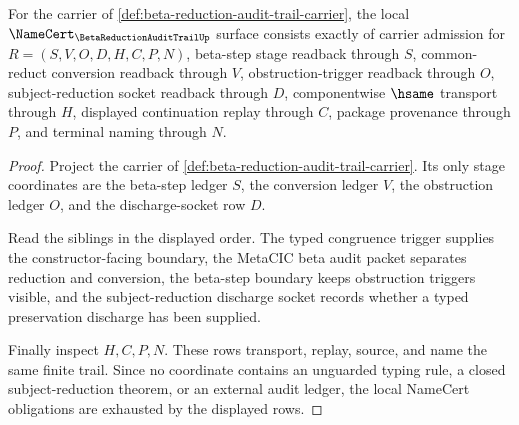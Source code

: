\begin{theorem}
\label{thm:beta-reduction-audit-trail-namecert-obligations}
For the carrier of \autoref{def:beta-reduction-audit-trail-carrier}, the local
$\NameCert_{\BetaReductionAuditTrailUp}$ surface consists exactly of carrier
admission for $R=(S,V,O,D,H,C,P,N)$, beta-step stage readback through $S$,
common-reduct conversion readback through $V$, obstruction-trigger readback
through $O$, subject-reduction socket readback through $D$, componentwise
$\hsame$ transport through $H$, displayed continuation replay through $C$,
package provenance through $P$, and terminal naming through $N$.
\end{theorem}
\begin{proof}
Project the carrier of
\autoref{def:beta-reduction-audit-trail-carrier}. Its only stage coordinates
are the beta-step ledger $S$, the conversion ledger $V$, the obstruction
ledger $O$, and the discharge-socket row $D$.

Read the siblings in the displayed order. The typed congruence trigger supplies
the constructor-facing boundary, the MetaCIC beta audit packet separates
reduction and conversion, the beta-step boundary keeps obstruction triggers
visible, and the subject-reduction discharge socket records whether a typed
preservation discharge has been supplied.

Finally inspect $H,C,P,N$. These rows transport, replay, source, and name the
same finite trail. Since no coordinate contains an unguarded typing rule, a
closed subject-reduction theorem, or an external audit ledger, the local
NameCert obligations are exhausted by the displayed rows.
\end{proof}

